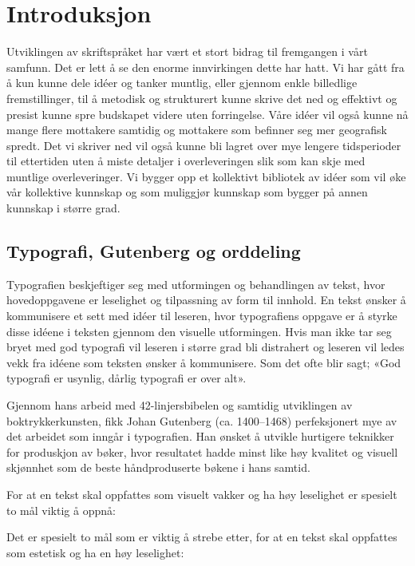 \chapter{Introduksjon}

Utviklingen av skriftspråket har vært et stort bidrag til fremgangen i vårt samfunn. Det er lett å se den enorme innvirkingen dette har hatt. Vi har gått fra å kun kunne dele idéer og tanker muntlig, eller gjennom enkle billedlige fremstillinger, til å metodisk og strukturert kunne skrive det ned og effektivt og presist kunne spre budskapet videre uten forringelse. Våre idéer vil også kunne nå mange flere mottakere samtidig og mottakere som befinner seg mer geografisk spredt. Det vi skriver ned vil også kunne bli lagret over mye lengere tidsperioder til ettertiden uten å miste detaljer i overleveringen slik som kan skje med muntlige overleveringer. Vi bygger opp et kollektivt bibliotek av idéer som vil øke vår kollektive kunnskap og som muliggjør kunnskap som bygger på annen kunnskap i større grad.

\section{Typografi, Gutenberg og orddeling}

Typografien beskjeftiger seg med utformingen og behandlingen av tekst, hvor hovedoppgavene er leselighet og tilpassning av form til innhold. En tekst ønsker å kommunisere et sett med idéer til leseren, hvor typografiens oppgave er å styrke disse idéene i teksten gjennom den visuelle utformingen. Hvis man ikke tar seg bryet med god typografi vil leseren i større grad bli distrahert og leseren vil ledes vekk fra idéene som teksten ønsker å kommunisere. Som det ofte blir sagt; «God typografi er usynlig, dårlig typografi er over alt».

Gjennom hans arbeid med 42-linjersbibelen og samtidig utviklingen av boktrykkerkunsten, fikk Johan Gutenberg (ca. 1400–1468) perfeksjonert mye av det arbeidet som inngår i typografien. Han ønsket å utvikle hurtigere teknikker for produskjon av bøker, hvor resultatet hadde minst like høy kvalitet og visuell skjønnhet som de beste håndproduserte bøkene i hans samtid. 

For at en tekst skal oppfattes som visuelt vakker og ha høy leselighet er spesielt to mål viktig å oppnå: 

Det er spesielt to mål som er viktig å strebe etter, for at en tekst skal oppfattes som estetisk og ha en høy leselighet:

